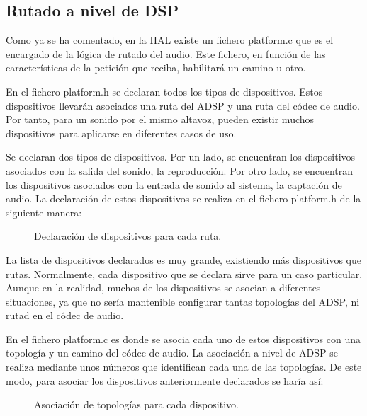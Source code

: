 \subsection{Rutado a nivel de DSP}
Como ya se ha comentado, en la \gls{HAL} existe un fichero platform.c que es el encargado de la lógica de rutado del audio. Este fichero, en función de las características de la petición que reciba, habilitará un camino u otro.

En el fichero platform.h se declaran todos los tipos de dispositivos. Estos dispositivos llevarán asociados una ruta del \gls{ADSP} y una ruta del códec de audio. Por tanto, para un sonido por el mismo altavoz, pueden existir muchos dispositivos para aplicarse en diferentes casos de uso.

Se declaran dos tipos de dispositivos. Por un lado, se encuentran los dispositivos asociados con la salida del sonido, la reproducción. Por otro lado, se encuentran los dispositivos asociados con la entrada de sonido al sistema, la captación de audio. La declaración de estos dispositivos se realiza en el fichero platform.h de la siguiente manera:

\begin{figure}[H]
	\centering
	\caption{Declaración de dispositivos para cada ruta.} \label{fig:declaracion_snd}
\end{figure} 

La lista de dispositivos declarados es muy grande, existiendo más dispositivos que rutas. Normalmente, cada dispositivo que se declara sirve para un caso particular. Aunque en la realidad, muchos de los dispositivos se asocian a diferentes situaciones, ya que no sería mantenible configurar tantas topologías del \gls{ADSP}, ni rutad en el códec de audio.

En el fichero platform.c es donde se asocia cada uno de estos dispositivos con una topología y un camino del códec de audio. La asociación a nivel de \gls{ADSP} se realiza mediante unos números que identifican cada una de las topologías. De este modo, para asociar los dispositivos anteriormente declarados se haría así:

\begin{figure}[H]
	\centering
	\caption{Asociación de topologías para cada dispositivo.} \label{fig:asociacion_acdb_id}
\end{figure} 

